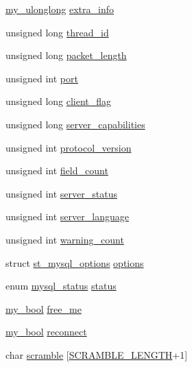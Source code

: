 \begin{DoxyCompactItemize}
\item 
\hyperlink{mysql_8h_ae05bd5d3e5a75578e2f14cfeb43f07aa}{my\+\_\+ulonglong} \hyperlink{structst__mysql_ab70022082b9c53ab9c9fc8b966ad2d8a}{extra\+\_\+info}
\item 
unsigned long \hyperlink{structst__mysql_a9f32d330dbd811f50b7440786febb25f}{thread\+\_\+id}
\item 
unsigned long \hyperlink{structst__mysql_afa6ee000a88fe95750c9f1acd9711023}{packet\+\_\+length}
\item 
unsigned int \hyperlink{structst__mysql_a285c6023c0903a47d4e6cdebde4c6dfe}{port}
\item 
unsigned long \hyperlink{structst__mysql_af572471668d07fd887bc68d44375d8a5}{client\+\_\+flag}
\item 
unsigned long \hyperlink{structst__mysql_ab9c7460496350f7aa331c104aa54717d}{server\+\_\+capabilities}
\item 
unsigned int \hyperlink{structst__mysql_a43e5c1629a6db251dc9b5d4eecceb209}{protocol\+\_\+version}
\item 
unsigned int \hyperlink{structst__mysql_a7bedc1452ea1a2b76634e92196a02991}{field\+\_\+count}
\item 
unsigned int \hyperlink{structst__mysql_ab875d849ff6f754a85986fe538408667}{server\+\_\+status}
\item 
unsigned int \hyperlink{structst__mysql_a855f117151afa573d46f988e2e01393a}{server\+\_\+language}
\item 
unsigned int \hyperlink{structst__mysql_a397568fcafb4431f45aaddce083d680e}{warning\+\_\+count}
\item 
struct \hyperlink{structst__mysql__options}{st\+\_\+mysql\+\_\+options} \hyperlink{structst__mysql_af5b1e7032c012c17dbb967fa4ac212a9}{options}
\item 
enum \hyperlink{mysql_8h_a8c0cf7afc762670cf296e4a0067cae5d}{mysql\+\_\+status} \hyperlink{structst__mysql_abd3b5b4aa083403f1025f688731b196e}{status}
\item 
\hyperlink{mysql_8h_a74cd599039dcf29c6e6d342cf4efd0a8}{my\+\_\+bool} \hyperlink{structst__mysql_a360756ba79af768da73d528969759b64}{free\+\_\+me}
\item 
\hyperlink{mysql_8h_a74cd599039dcf29c6e6d342cf4efd0a8}{my\+\_\+bool} \hyperlink{structst__mysql_a802266361a427c12d6cb29a27f8889b1}{reconnect}
\item 
char \hyperlink{structst__mysql_ae6e34dfb59ec6f6842f65a58eb6bee38}{scramble} \mbox{[}\hyperlink{mysql__com_8h_a45f11cf97b6dec62756b92cbb96f7418}{S\+C\+R\+A\+M\+B\+L\+E\+\_\+\+L\+E\+N\+G\+T\+H}+1\mbox{]}

\end{DoxyCompactItemize}
